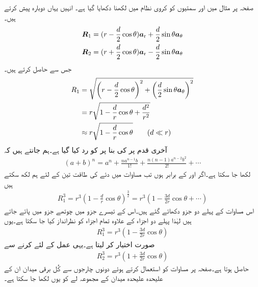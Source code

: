 صفحہ  پر مثال  میں  اور
  سمتیوں کو کروی نظام میں لکھنا دکھایا گیا ہے۔ انہیں یہاں دوبارہ پیش کرتے ہیں۔
\begin{align*}
{\ensuremath{{\boldsymbol{R}}}}_1 &=(r-\frac{d}{2}\cos\theta){\boldsymbol{a}}_{\textup{r}}+\frac{d}{2}\sin\theta {\boldsymbol{a}}_{\theta}\\
{{\boldsymbol{R}}}_2 &=(r+\frac{d}{2}\cos \theta ){\boldsymbol{a}}_{\textup{r}}-\frac{d}{2}\sin \theta {\boldsymbol{a}}_{\theta}
\end{align*}
جس سے  حاصل کرتے ہیں۔
\begin{gather}
\begin{aligned}\label{مساوات_توانائی_جفت_قطب_فاصلے}
R_1&=\sqrt{\left(r-\frac{d}{2}\cos\theta\right)^2+\left(\frac{d}{2}\sin\theta {\boldsymbol{a}}_{\theta} \right)^2}\\
&=r \sqrt{1-\frac{d}{r} \cos \theta +\frac{d^2}{r^2}}\\
&\approx r \sqrt{1-\frac{d}{r} \cos \theta } \quad \quad (d \ll r)
\end{aligned}
\end{gather}
آخری قدم پر  کی بنا پر  کو رد کیا گیا ہے۔ہم جانتے ہیں کہ
\begin{align*}
(a+b)^n=a^n +\frac{n a^{n-1}b}{1!}+\frac{n(n-1)a^{n-2}b^2}{2!}+\cdots
\end{align*}
لکھا جا سکتا ہے۔اگر  اور  کے برابر ہوں تب مساوات  میں دئے  کی طاقت تین کے لئے ہم لکھ سکتے ہیں
\begin{align*}
R_1^3=r^3 (1-\tfrac{d}{r} \cos \theta)^{\frac{3}{2}}=r^3 \left( 1-\tfrac{3d}{2 r} \cos \theta+\cdots \right)
\end{align*}
اس مساوات کے پہلے دو جزو دکھائے گئے ہیں۔اس کے تیسرے جزو میں چوتھے جزو میں  پائے جاتے ہیں  لہٰذا پہلے دو اجزاء کے علاوہ تمام اجزاء کو نظرانداز کیا جا سکتا ہے۔یوں
\begin{align}
R_1^3=r^3 \left(1-\frac{3d}{2r} \cos \theta\right)
\end{align}
صورت اختیار کر لیتا ہے۔یہی عمل  کے لئے کرنے سے
\begin{align}
R_2^3=r^3 \left(1+\frac{3d}{2r} \cos \theta\right)
\end{align}
حاصل ہوتا ہے۔صفحہ  پر مساوات  کو استعمال کرتے ہوئے دونوں چارجوں سے کُل برقی میدان ان کے علیحدہ علیحدہ میدان کے مجموعہ لے کو یوں لکھا جا سکتا ہے۔
